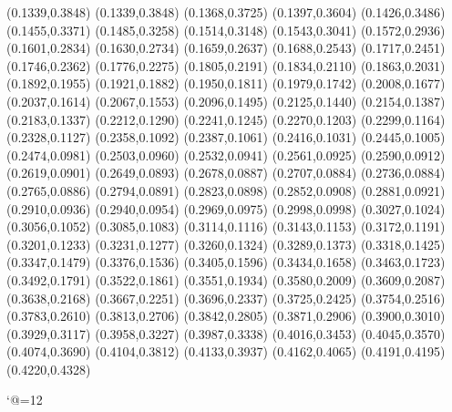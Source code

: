 \PST@Solid(0.1339,0.3848)
(0.1339,0.3848)
(0.1368,0.3725)
(0.1397,0.3604)
(0.1426,0.3486)
(0.1455,0.3371)
(0.1485,0.3258)
(0.1514,0.3148)
(0.1543,0.3041)
(0.1572,0.2936)
(0.1601,0.2834)
(0.1630,0.2734)
(0.1659,0.2637)
(0.1688,0.2543)
(0.1717,0.2451)
(0.1746,0.2362)
(0.1776,0.2275)
(0.1805,0.2191)
(0.1834,0.2110)
(0.1863,0.2031)
(0.1892,0.1955)
(0.1921,0.1882)
(0.1950,0.1811)
(0.1979,0.1742)
(0.2008,0.1677)
(0.2037,0.1614)
(0.2067,0.1553)
(0.2096,0.1495)
(0.2125,0.1440)
(0.2154,0.1387)
(0.2183,0.1337)
(0.2212,0.1290)
(0.2241,0.1245)
(0.2270,0.1203)
(0.2299,0.1164)
(0.2328,0.1127)
(0.2358,0.1092)
(0.2387,0.1061)
(0.2416,0.1031)
(0.2445,0.1005)
(0.2474,0.0981)
(0.2503,0.0960)
(0.2532,0.0941)
(0.2561,0.0925)
(0.2590,0.0912)
(0.2619,0.0901)
(0.2649,0.0893)
(0.2678,0.0887)
(0.2707,0.0884)
(0.2736,0.0884)
(0.2765,0.0886)
(0.2794,0.0891)
(0.2823,0.0898)
(0.2852,0.0908)
(0.2881,0.0921)
(0.2910,0.0936)
(0.2940,0.0954)
(0.2969,0.0975)
(0.2998,0.0998)
(0.3027,0.1024)
(0.3056,0.1052)
(0.3085,0.1083)
(0.3114,0.1116)
(0.3143,0.1153)
(0.3172,0.1191)
(0.3201,0.1233)
(0.3231,0.1277)
(0.3260,0.1324)
(0.3289,0.1373)
(0.3318,0.1425)
(0.3347,0.1479)
(0.3376,0.1536)
(0.3405,0.1596)
(0.3434,0.1658)
(0.3463,0.1723)
(0.3492,0.1791)
(0.3522,0.1861)
(0.3551,0.1934)
(0.3580,0.2009)
(0.3609,0.2087)
(0.3638,0.2168)
(0.3667,0.2251)
(0.3696,0.2337)
(0.3725,0.2425)
(0.3754,0.2516)
(0.3783,0.2610)
(0.3813,0.2706)
(0.3842,0.2805)
(0.3871,0.2906)
(0.3900,0.3010)
(0.3929,0.3117)
(0.3958,0.3227)
(0.3987,0.3338)
(0.4016,0.3453)
(0.4045,0.3570)
(0.4074,0.3690)
(0.4104,0.3812)
(0.4133,0.3937)
(0.4162,0.4065)
(0.4191,0.4195)
(0.4220,0.4328)

\catcode`@=12
\fi
\endpspicture
